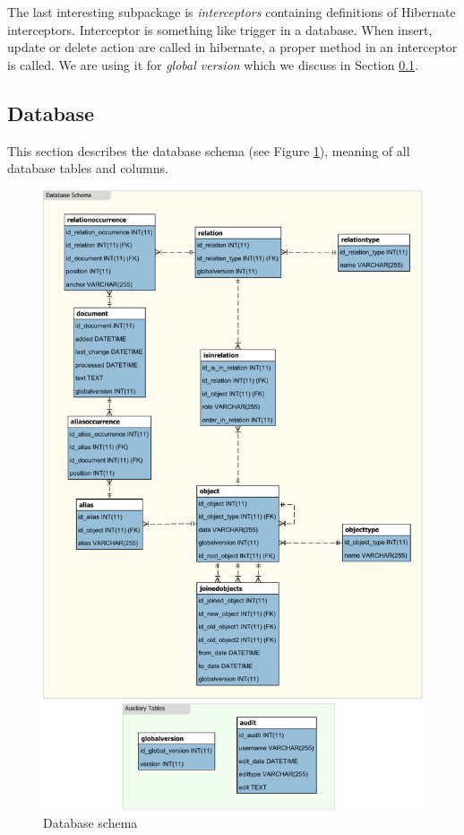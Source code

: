
The last interesting subpackage is \emph{interceptors} containing definitions
of Hibernate interceptors. Interceptor is something like trigger in a database.
When insert, update or delete action are called in hibernate, a proper method
in an interceptor is called. We are using it for \emph{global version} which we
discuss in Section \ref{sec:Database}.

\subsection{Database}
\label{sec:Database}

This section describes the database schema (see Figure \ref{fig:DatabaseSchema}), meaning of all database tables and columns.

\begin{figure}[!htb]
        \centering
        \includegraphics[width=\textwidth, 
        				 height=(\textheight - 2cm), 
        				 keepaspectratio]
        				 {Images/DatabaseSchemaPortrait-crop}
        \caption{Database schema}
        \label{fig:DatabaseSchema}
\end{figure}

